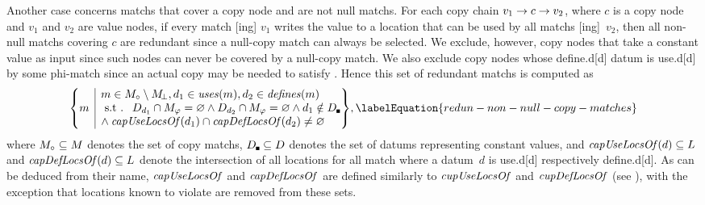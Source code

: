Another case concerns \glspl{match} that cover a \gls{copy node} and are not
\glspl{null match}.
%
For each copy chain \mbox{$v_1 \rightarrow c \rightarrow v_2$}, where $c$ is a
\gls{copy node} and $v_1$ and $v_2$ are \glspl{value node}, if every \gls{match}
[ing] $v_1$ writes the value to a \gls{location} that can be
used by all \glspl{match} [ing]~$v_2$, then all non-\glspl{null
  match} covering $c$ are redundant since a \gls{null-copy match} can always be
selected.
%
We exclude, however, \glspl{copy node} that take a constant value as input since
such \glspl{node} can never be covered by a \gls{null-copy match}.
%
We also exclude \glspl{copy node} whose \gls{define.d}[d] \gls{datum} is
\gls{use.d}[d] by some \gls{phi-match} since an actual copy may be needed to
satisfy .
%
Hence this set of redundant \glspl{match} is computed as
%
\begin{equation}
  \mSetBuilder*{m}%
               {%
                 \begin{array}{@{}l@{}}
                   m \in \mCopyMatchSet \setminus \mNullMatchSet,
                   d_1 \in \mUses(m),
                   d_2 \in \mDefines(m) \\
                   \text{\st }
                   \mDataSet[d_1] \cap \mPhiMatchSet = \mEmptySet
                   \mAnd
                   \mDataSet[d_2] \cap \mPhiMatchSet = \mEmptySet
                   \mAnd
                   d_1 \notin \mConstDataSet \\
                   \mbox{}\hspace{-2pt} \mAnd
                   \mCapUseLocsOf(d_1) \cap \mCapDefLocsOf(d_2) \neq \mEmptySet
                 \end{array}
               }\!,
  \labelEquation{redun-non-null-copy-matches}
\end{equation}
%
where \mbox{$\mCopyMatchSet \subseteq \mMatchSet$} denotes the set of
\glspl{copy match}, \mbox{$\mConstDataSet \subseteq \mDataSet$} denotes the set
of \glspl{datum} representing constant values, and \mbox{$\operatorname{\textrm{\textit{capUseLocsOf}}}(d)
  \subseteq L$} and \mbox{$\operatorname{\textrm{\textit{capDefLocsOf}}}(d) \subseteq
  L$} denote the intersection of all \glspl{location} for all
\gls{match} where a \gls{datum}~$d$ is \gls{use.d}[d] respectively
\gls{define.d}[d].
%
As can be deduced from their name, $\operatorname{\textrm{\textit{capUseLocsOf}}}$ and $\operatorname{\textrm{\textit{capDefLocsOf}}}$ are
defined similarly to $\operatorname{\textrm{\textit{cupUseLocsOf}}}$ and $\operatorname{\textrm{\textit{cupDefLocsOf}}}$ (see
), with the
exception that \glspl{location} known to violate
 are removed from these sets.


